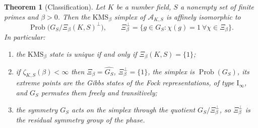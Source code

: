 \documentclass[11pt]{amsart}
\numberwithin{equation}{section}
\newtheorem{theorem}{Theorem}[section]
\theoremstyle{definition}
\theoremstyle{remark}
\newcommand{\Prob}{\operatorname{Prob}}
\newcommand{\cA}{\mathcal{A}}
\begin{document}
\begin{theorem}[Classification]\label{thm:main}
Let $K$ be a number field, $S$ a nonempty set of finite primes and $\beta>0$.
Then the $\mathrm{KMS}_\beta$ simplex of $\cA_{K,S}$ is affinely isomorphic to
\[
\Prob\bigl(G_S/\Xi_\beta(K,S)^\perp\bigr),\qquad
\Xi_\beta^\perp=\{g\in G_S:\chi(g)=1\ \forall\chi\in\Xi_\beta\}.
\]
In particular:
\begin{enumerate}
\item the $\mathrm{KMS}_\beta$ state is unique if and only if
$\Xi_\beta(K,S)=\{1\}$;
\item if $\zeta_{K,S}(\beta)<\infty$ then $\Xi_\beta=\widehat{G_S}$,
$\Xi_\beta^\perp=\{1\}$, the simplex is $\Prob(G_S)$, its extreme points are the
Gibbs states of the Fock representations, of type $\mathrm I_\infty$, and $G_S$
permutes them freely and transitively;
\item the symmetry $G_S$ acts on the simplex through the quotient
$G_S/\Xi_\beta^\perp$, so $\Xi_\beta^\perp$ is the residual symmetry group of
the phase.
\end{enumerate}
\end{theorem}
\end{document}
